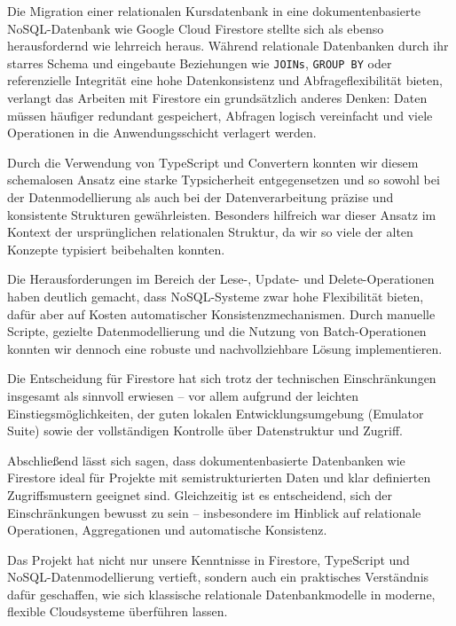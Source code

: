 \documentclass[12pt,a4paper%
              ,oneside     %
              ,titlepage
              ,DIV=13
              ,headinclude
              ,footinclude=false%
              ,cleardoublepage=empty%
              ,parskip=half,
              BCOR=0mm,
              ]{scrreprt}
\begin{document}
Die Migration einer relationalen Kursdatenbank in eine dokumentenbasierte NoSQL-Datenbank wie Google Cloud Firestore stellte sich als ebenso herausfordernd wie lehrreich heraus. Während relationale Datenbanken durch ihr starres Schema und eingebaute Beziehungen wie \texttt{JOINs}, \texttt{GROUP BY} oder referenzielle Integrität eine hohe Datenkonsistenz und Abfrageflexibilität bieten, verlangt das Arbeiten mit Firestore ein grundsätzlich anderes Denken: Daten müssen häufiger redundant gespeichert, Abfragen logisch vereinfacht und viele Operationen in die Anwendungsschicht verlagert werden.

Durch die Verwendung von TypeScript und Convertern konnten wir diesem schemalosen Ansatz eine starke Typsicherheit entgegensetzen und so sowohl bei der Datenmodellierung als auch bei der Datenverarbeitung präzise und konsistente Strukturen gewährleisten. Besonders hilfreich war dieser Ansatz im Kontext der ursprünglichen relationalen Struktur, da wir so viele der alten Konzepte typisiert beibehalten konnten.

Die Herausforderungen im Bereich der Lese-, Update- und Delete-Operationen haben deutlich gemacht, dass NoSQL-Systeme zwar hohe Flexibilität bieten, dafür aber auf Kosten automatischer Konsistenzmechanismen. Durch manuelle Scripte, gezielte Datenmodellierung und die Nutzung von Batch-Operationen konnten wir dennoch eine robuste und nachvollziehbare Lösung implementieren.

Die Entscheidung für Firestore hat sich trotz der technischen Einschränkungen insgesamt als sinnvoll erwiesen – vor allem aufgrund der leichten Einstiegsmöglichkeiten, der guten lokalen Entwicklungsumgebung (Emulator Suite) sowie der vollständigen Kontrolle über Datenstruktur und Zugriff.

Abschließend lässt sich sagen, dass dokumentenbasierte Datenbanken wie Firestore ideal für Projekte mit semistrukturierten Daten und klar definierten Zugriffsmustern geeignet sind. Gleichzeitig ist es entscheidend, sich der Einschränkungen bewusst zu sein – insbesondere im Hinblick auf relationale Operationen, Aggregationen und automatische Konsistenz.

Das Projekt hat nicht nur unsere Kenntnisse in Firestore, TypeScript und NoSQL-Datenmodellierung vertieft, sondern auch ein praktisches Verständnis dafür geschaffen, wie sich klassische relationale Datenbankmodelle in moderne, flexible Cloudsysteme überführen lassen.


\appendix




\renewcommand{\bibfont}{\footnotesize}
\printbibliography[title={Literaturverzeichnis}, 
                   heading=bibintoc]


{ %
\printindex
}
\end{document}
